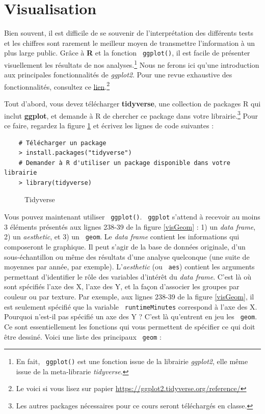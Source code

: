 \documentclass[10.5pt,a4paper]{article}
\newcommand{\rcode}[1]{\texttt{\color{rstudio} #1}}
\begin{document}
  \section{Visualisation}
  Bien souvent, il est difficile de se souvenir de l'interprétation des différents tests et les chiffres sont rarement le meilleur moyen de transmettre l'information à un plus large public. Grâce à \textbf{R} et la fonction \rcode{ggplot()}, il est facile de présenter visuellement les résultats de nos analyses.\footnote{En fait, \rcode{ggplot()} est une fonction issue de la librairie \textit{ggplot2}, elle même issue de la meta-librarie \textit{tidyverse}.} Nous ne ferons ici qu'une introduction aux principales fonctionnalités de \textit{ggplot2}. Pour une revue exhaustive des fonctionnalités, consultez ce \href{https://ggplot2.tidyverse.org/reference/}{lien}.\footnote{Le voici si vous lisez sur papier \href{https://ggplot2.tidyverse.org/reference/}{https://ggplot2.tidyverse.org/reference/}}
  
  Tout d'abord, vous devez télécharger \textbf{tidyverse}, une collection de packages R qui inclut \textbf{ggplot}, et demande à R de chercher ce package dans votre librairie.\footnote{Les autres packages nécessaires pour ce cours seront téléchargés en classe.} Pour ce faire, regardez la figure \ref{telTidy} et écrivez les lignes de code suivantes :
  
        \begin{lstlisting}
    # Télécharger un package
    > install.packages("tidyverse")
    # Demander à R d'utiliser un package disponible dans votre librairie 
    > library(tidyverse)
    \end{lstlisting}
    
    \begin{figure}[H]
    \centering
    \caption{Tidyverse}
    \label{telTidy}
    \end{figure}
    
Vous pouvez maintenant utiliser \rcode{ggplot()}. \rcode{ggplot} s'attend à recevoir au moins 3 éléments présentés aux lignes 238-39 de la figure \ref{visGeom} : 1) un \emph{data frame}, 2) un \textit{aesthetic}, et 3) un \rcode{geom}. Le \emph{data frame} contient les informations qui composeront le graphique. Il peut s'agir de la base de données originale, d'un sous-échantillon ou même des résultats d'une analyse quelconque (une suite de moyennes par année, par exemple). L'\textit{aesthetic} (ou \rcode{aes}) contient les arguments permettant d'identifier le rôle des variables d'intérêt du \emph{data frame}. C'est là où sont spécifiés l'axe des X, l'axe des Y, et la façon d'associer les groupes par couleur ou par texture. Par exemple, aux lignes 238-39 de la figure \ref{visGeom}, il est seulement spécifié que la variable \rcode{runtimeMinutes} correspond à l'axe des X. Pourquoi n'est-il pas spécifié un axe des Y ? C'est là qu'entrent en jeu les \rcode{geom}. Ce sont essentiellement les fonctions qui vous permettent de spécifier ce qui doit être dessiné. Voici une liste des principaux \rcode{geom} :
  
\end{document}
